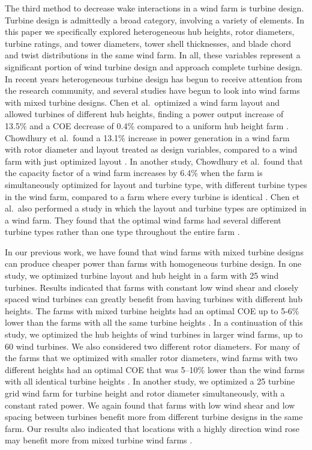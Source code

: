 \documentclass[WESD, manuscript]{copernicus}
\begin{document}
The third method to decrease wake interactions in a wind farm is turbine design. Turbine design is admittedly a broad category, involving a variety of elements. In this paper we specifically explored heterogeneous hub heights, rotor diameters, turbine ratings, and tower diameters, tower shell thicknesses, and blade chord and twist distributions in the same wind farm. In all, these variables represent a significant portion of wind turbine design and approach complete turbine design. 
In recent years heterogeneous turbine design has begun to receive attention from the research community, and several studies have begun to look into wind farms with mixed turbine designs. Chen et al.~optimized
a wind farm layout and allowed turbines of different hub heights, finding a power output increase of 13.5\% and a COE decrease of 0.4\% compared to a uniform hub height farm \citep{chen2013wind}. Chowdhury et al.~found
a 13.1\% increase in power generation in a wind farm with rotor diameter and layout treated as design variables, compared to a wind farm with just optimized layout \citep{chowdhury2010optimizing}. In another study, Chowdhury et al.~found that the capacity factor of a wind farm increases by 6.4\% when the farm is simultaneously optimized for layout and turbine type, with different turbine types in the wind farm, compared to a farm where every turbine is identical \citep{chowdhury2013optimizing}. Chen et al.~also performed a study in which the layout and turbine types are optimized in a wind farm. They found that the optimal wind farms had several different turbine types rather than one type throughout the entire farm \citep{chen2015multi}.

In our previous work, we have found that wind farms with mixed turbine designs can produce cheaper power than farms with homogeneous turbine design. In one study, we optimized turbine layout and hub height in a farm with 25 wind turbines. Results indicated that farms with constant low wind shear and closely spaced wind turbines can greatly benefit from having turbines with different hub heights. The farms with mixed turbine heights had an optimal COE up to 5-6\% lower than the farms with all the same turbine heights \citep{stanley2017gradient}. In a continuation of this study, we optimized the hub heights of wind turbines in larger wind farms, up to 60 wind turbines. We also considered two different rotor diameters. For many of the farms that we optimized with smaller rotor diameters, wind farms with two different heights had an optimal COE that was 5--10\% lower than the wind farms with all identical turbine heights \citep{stanley2018}. In another study, we optimized a 25 turbine grid wind farm for turbine height and rotor diameter simultaneously, with a constant rated power. We again found that farms with low wind shear and low spacing between turbines benefit more from different turbine designs in the same farm. Our results also indicated that locations with a highly direction wind rose may benefit more from mixed turbine wind farms \citep{Stanley2018_conf}.
\end{document}
